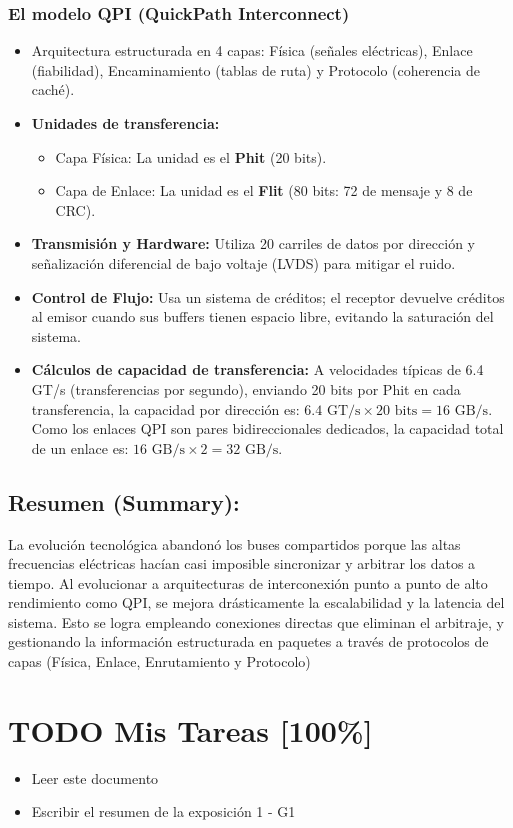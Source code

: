\documentclass{article}
\begin{document}
\subsubsection{El modelo QPI (QuickPath Interconnect)}
\label{sec:org4cd4940}
\begin{itemize}
\item Arquitectura estructurada en 4 capas: Física (señales eléctricas), Enlace (fiabilidad), Encaminamiento (tablas de ruta) y Protocolo (coherencia de caché).
\item \textbf{Unidades de transferencia:} 
\begin{itemize}
\item Capa Física: La unidad es el \textbf{Phit} (20 bits).
\item Capa de Enlace: La unidad es el \textbf{Flit} (80 bits: 72 de mensaje y 8 de CRC).
\end{itemize}
\item \textbf{Transmisión y Hardware:} Utiliza 20 carriles de datos por dirección y señalización diferencial de bajo voltaje (LVDS) para mitigar el ruido.
\item \textbf{Control de Flujo:} Usa un sistema de créditos; el receptor devuelve créditos al emisor cuando sus buffers tienen espacio libre, evitando la saturación del sistema.
\item \textbf{Cálculos de capacidad de transferencia:} 
A velocidades típicas de 6.4 GT/s (transferencias por segundo), enviando 20 bits por Phit en cada transferencia, la capacidad por dirección es:
\(6.4 \text{ GT/s} \times 20 \text{ bits} = 16 \text{ GB/s}\).
Como los enlaces QPI son pares bidireccionales dedicados, la capacidad total de un enlace es:
\(16 \text{ GB/s} \times 2 = 32 \text{ GB/s}\).
\end{itemize}
\subsection{Resumen (Summary):}
\label{sec:orga1c070b}
La evolución tecnológica abandonó los buses compartidos porque las
altas frecuencias eléctricas hacían casi imposible sincronizar y
arbitrar los datos a tiempo. Al evolucionar a arquitecturas de
interconexión punto a punto de alto rendimiento como QPI, se mejora
drásticamente la escalabilidad y la latencia del sistema. Esto se
logra empleando conexiones directas que eliminan el arbitraje, y
gestionando la información estructurada en paquetes a través de
protocolos de capas (Física, Enlace, Enrutamiento y Protocolo)


\section{{\bfseries\sffamily TODO} Mis Tareas [100\%]}
\label{sec:org24bd83b}
\begin{itemize}
\item[{$\boxtimes$}] Leer este documento
\item[{$\boxtimes$}] Escribir el resumen  de la exposición 1 - G1
\end{itemize}

\printbibliography
\end{document}
